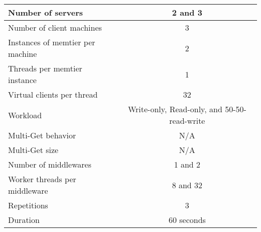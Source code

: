 \documentclass[11pt,a4paper]{article}
\begin{document}
\begin{center}
	\scriptsize{
		\begin{tabular}{|l|c|}
			\hline Number of servers                & 2 and 3                                     \\ 
			\hline Number of client machines        & 3                                           \\ 
			\hline Instances of memtier per machine & 2                                           \\ 
			\hline Threads per memtier instance     & 1                                           \\
			\hline Virtual clients per thread       & 32                                     \\ 
			\hline Workload                         & Write-only, Read-only, and 50-50-read-write \\
			\hline Multi-Get behavior               & N/A                                         \\
			\hline Multi-Get size                   & N/A                                         \\
			\hline Number of middlewares            & 1 and 2                                     \\
			\hline Worker threads per middleware    & 8 and 32                                    \\
			\hline Repetitions                      & 3                                   \\ 
			\hline Duration                         & 60 seconds        \\
			\hline 
		\end{tabular}
	} 
\end{center}
\end{document}
